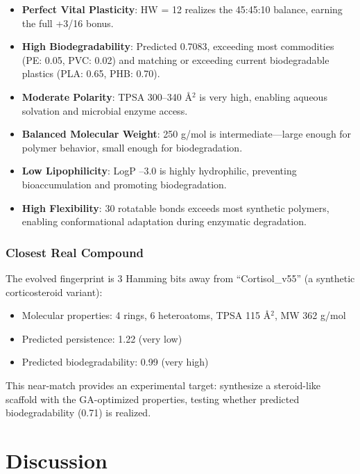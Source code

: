 \documentclass[11pt,letterpaper]{article}
\begin{document}
\begin{itemize}
    \item \textbf{Perfect Vital Plasticity}: HW = 12 realizes the 45:45:10 balance, earning the full +3/16 bonus.
    
    \item \textbf{High Biodegradability}: Predicted 0.7083, exceeding most commodities (PE: 0.05, PVC: 0.02) and matching or exceeding current biodegradable plastics (PLA: 0.65, PHB: 0.70).
    
    \item \textbf{Moderate Polarity}: TPSA 300--340 \AA$^2$ is very high, enabling aqueous solvation and microbial enzyme access.
    
    \item \textbf{Balanced Molecular Weight}: 250 g/mol is intermediate---large enough for polymer behavior, small enough for biodegradation.
    
    \item \textbf{Low Lipophilicity}: LogP --3.0 is highly hydrophilic, preventing bioaccumulation and promoting biodegradation.
    
    \item \textbf{High Flexibility}: 30 rotatable bonds exceeds most synthetic polymers, enabling conformational adaptation during enzymatic degradation.
\end{itemize}

\subsubsection{Closest Real Compound}

The evolved fingerprint is 3 Hamming bits away from ``Cortisol\_v55'' (a synthetic corticosteroid variant):

\begin{itemize}
    \item Molecular properties: 4 rings, 6 heteroatoms, TPSA 115 \AA$^2$, MW 362 g/mol
    \item Predicted persistence: 1.22 (very low)
    \item Predicted biodegradability: 0.99 (very high)
\end{itemize}

This near-match provides an experimental target: synthesize a steroid-like scaffold with the GA-optimized properties, testing whether predicted biodegradability (0.71) is realized.

\section{Discussion}
\end{document}
